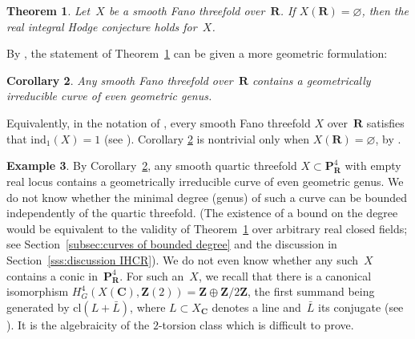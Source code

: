 \documentclass[JEP,XML,SOM,Unicode]{cedram}
\theoremstyle{plain}
\newtheorem{thm}{Theorem}[section]
\newtheorem{cor}[thm]{Corollary}
\theoremstyle{definition}
\newtheorem{example}[thm]{Example}
\numberwithin{equation}{section}
\newcommand{\cl}{{\mathrm{cl}}}
\renewcommand{\C}{{\mathbf C}}
\renewcommand{\P}{{\mathbf P}}
\newcommand{\R}{{\mathbf R}}
\newcommand{\Z}{{\mathbf Z}}
\renewcommand{\emptyset}{\varnothing}
\newcommand{\elw}{\mathrm{ind}}
\begin{document}
\begin{thm}
\label{thm:solides fano}
Let~$X$ be a smooth Fano threefold over~$\R$. If $X(\R)=\emptyset$, then the real integral Hodge conjecture holds for~$X$.
\end{thm}

By \cite[Cor.\,\ref*{BW1-cor:IHC pour solides RC ou CY} and Prop.\,\ref*{BW1-prop:parity of genus in irrelevant situations}]{BW1},
the statement of Theorem~\ref{thm:solides fano} can be given a more geometric formulation:

\begin{cor}
\label{cor:elw solides fano}
Any smooth Fano threefold over~$\R$ contains a geometrically
irreducible curve of even geometric genus.
\end{cor}

Equivalently, in the notation of \cite[\textsection\ref*{BW1-subsec:elw}]{BW1}, every smooth Fano threefold $X$ over~$\R$ satisfies that $\elw_1(X)=1$ (see \cite[Cor.\,\ref*{BW1-cor:what is elw1}]{BW1}). Corollary \ref{cor:elw solides fano} is nontrivial only when $X(\R)=\emptyset$, by \cite[Prop.\,\ref*{BW1-prop:parity of genus in irrelevant situations}]{BW1}.

\begin{example}
\label{ex:elw hypersurface quartique}
By Corollary~\ref{cor:elw solides fano}, any smooth quartic
threefold $X\subset \P^4_\R$
with empty real locus contains a geometrically irreducible curve of even geometric genus.
We do not know whether the minimal degree (\resp genus) of such a curve
can be bounded independently of the quartic threefold.
(The existence of a bound on the degree
would be equivalent to the validity of Theorem~\ref{thm:solides fano} over arbitrary real closed fields; see Section~\ref{subsec:curves of bounded degree} and the discussion in Section~\ref{sss:discussion IHCR}).
We do not even know whether any such~$X$ contains a conic in~$\P^4_\R$.
For such an~$X$,
we recall that there is a canonical isomorphism $H^4_G(X(\C),\Z(2))=\Z\oplus\Z/2\Z$,
the first summand being generated by $\cl(L+\bar L)$,
where $L\subset X_\C$ denotes a line and~$\bar L$ its conjugate
(see \cite[Lem.\,\ref*{BW1-lem:computation cohomology real quartic}]{BW1}).
It is the algebraicity of the $2$\nobreakdash-torsion
class which is difficult to prove.
\end{example}
\end{document}

